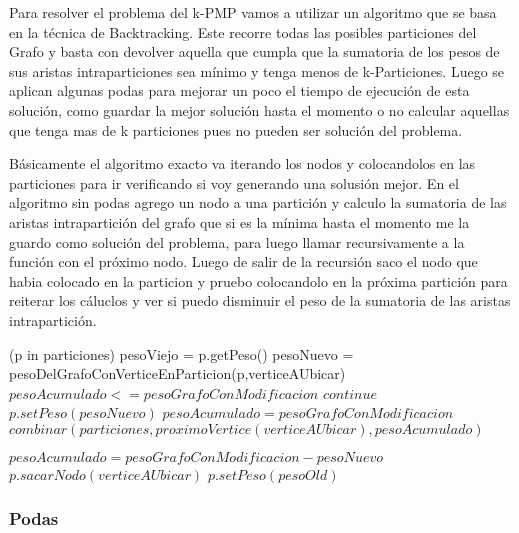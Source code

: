 Para resolver el problema del k-PMP vamos a utilizar un algoritmo que se basa en la t\'ecnica de Backtracking. Este recorre todas las posibles particiones del Grafo y basta con devolver aquella que cumpla que la sumatoria de los pesos de sus aristas intraparticiones sea m\'inimo y tenga menos de k-Particiones.
Luego se aplican algunas podas para mejorar un poco el tiempo de ejecuci\'on de esta soluci\'on, como guardar la mejor soluci\'on hasta el momento o no calcular aquellas que tenga mas de k particiones pues no pueden ser soluci\'on del problema.

Básicamente el algoritmo exacto va iterando los nodos y colocandolos en las particiones para ir verificando si voy generando una solusión mejor. En el algoritmo sin podas agrego un nodo a una partición y calculo la sumatoria de las aristas intrapartición del grafo que si es la mínima hasta el momento me la guardo como solución del problema, para luego llamar recursivamente a la función con el próximo nodo. Luego de salir de la recursión saco el nodo que habia colocado en la particion y pruebo colocandolo en la próxima partición para reiterar los cáluclos y ver si puedo disminuir el peso de la sumatoria de las aristas intrapartición.

\begin{codebox}
  \li \For (p in particiones)
  \li   pesoViejo = p.getPeso()
  \li   pesoNuevo = pesoDelGrafoConVerticeEnParticion(p,verticeAUbicar)
      \End
  \li   \If $pesoAcumulado <= pesoGrafoConModificacion$
  \li   \Then
          $continue$
  \li   \Else
  \li     $p.setPeso(pesoNuevo)$
  \li     $pesoAcumulado = pesoGrafoConModificacion$
  \li     $combinar(particiones, proximoVertice(verticeAUbicar), pesoAcumulado)$

  \li     $pesoAcumulado = pesoGrafoConModificacion - pesoNuevo$
  \li     $p.sacarNodo(verticeAUbicar)$
  \li     $p.setPeso(pesoOld)$

        \End
\end{codebox}

\subsubsection{Podas}




